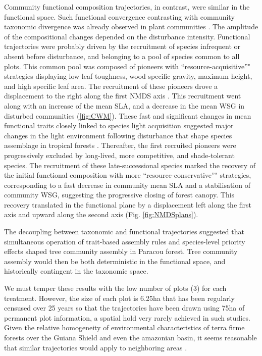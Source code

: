 \documentclass[fleqn,10pt]{ArtEcoFoG} %
\begin{document}
Community functional composition trajectories, in contrast, were similar in the functional space.
\color{red}Such functional convergence contrasting with community taxonomic divergence was already observed in plant communities \citep{Fukami2005}.\color{black}
The amplitude of the compositional changes depended on the disturbance intensity.
Functional trajectories were probably driven by the recruitment of species infrequent or absent before disturbance, and belonging to a pool of species common to all plots.
This common pool was composed of pioneers with ``resource-acquisitive''" strategies displaying low leaf toughness, wood specific gravity, maximum height, and high specific leaf area.
The recruitment of these pioneers drove a displacement to the right along the first NMDS axis \citep{Westoby1998, Wright2004, Reich2014}.
\color{red}This recruitment went along with an increase of the mean SLA, and a decrease in the mean WSG in disturbed communities (\ref{fig:CWM}).
These fast and significant changes in mean functional traits closely linked to species light acquisition \citep{Wright2004, Chave2009b} suggested major changes in the light environment following disturbance that shape species assemblage in tropical forests \citep{Pena2008, Carreno-Rocabado2012}. Thereafter, the first recruited pioneers were progressively excluded by long-lived, more competitive, and shade-tolerant species. The recruitment of these late-successional species marked the recovery of the initial functional composition with more ``resource-conservative''" strategies, corresponding to a fast decrease in community mean SLA and a stabilisation of community WSG, suggesting the progressive closing of forest canopy. \color{black}
This recovery translated in the functional plane by a displacement left along the first axis and upward along the second axis (Fig. \ref{fig:NMDSplans}).

The decoupling between taxonomic and functional trajectories suggested that simultaneous operation of trait-based assembly rules and species-level priority effects shaped tree community assembly in Paracou forest.
Tree community assembly would then be both deterministic in the functional space, and historically contingent in the taxonomic space.

\color{red}

We must temper these results with the low number of plots (3) for each treatment. However, the size of each plot is 6.25ha that has been regularly censused over 25 years so that the trajectories have been drawn using 75ha of permanent plot information, a spatial hold very rarely achieved in such studies. Given the relative homogeneity of environmental characteristics of terra firme forests over the Guiana Shield and even the amazonian basin, it seems reasonable that similar trajectories would apply to neighboring areas \citep{Guitet2015, Guitet2018}.
\color{black}
\end{document}
